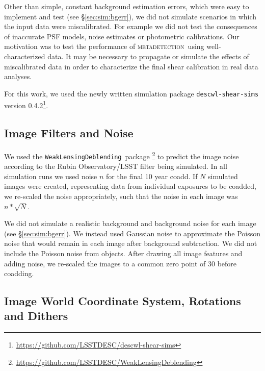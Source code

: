 \documentclass[twocolumn,twocolappendix,astrosym]{openjournal}
\newcommand{\descwl}{\texttt{WeakLensingDeblending}}
\newcommand{\mdet}{\textsc{metadetection}}
\begin{document}
Other than simple, constant background estimation errors, which were easy to
implement and test (see \S \ref{sec:sim:bgerr}), we did not simulate scenarios
in which the input data were miscalibrated.  For example we did not test the
consequences of inaccurate PSF models, noise estimates or photometric
calibrations.  Our motivation was to test the performance of \mdet\ using
well-characterized data. It may be necessary to propagate or simulate the
effects of miscalibrated data in order to characterize the final shear
calibration in real data analyses.

For this work, we used the newly written simulation package
\texttt{descwl-shear-sims} version
0.4.2\footnote{\url{https://github.com/LSSTDESC/descwl-shear-sims}}.

\subsection{Image Filters and Noise} \label{sec:sim:noise}

We used the \descwl\ package
\citep{DESCWLSanchez2021}\footnote{\url{https://github.com/LSSTDESC/WeakLensingDeblending}}
to predict the image noise according to the Rubin Observatory/LSST filter being
simulated.  In all simulation runs we used noise $n$ for the final 10 year
coadd.  If $N$ simulated images were created, representing data from individual
exposures to be coadded, we re-scaled the noise appropriately, such that the
noise in each image was $n * \sqrt{N}$.

We did not simulate a realistic background and background noise for each image
(see \S \ref{sec:sim:bgerr}).  We instead used Gaussian noise to approximate
the Poisson noise that would remain in each image after background subtraction.
We did not include the Poisson noise from objects.  After drawing all image
features and adding noise, we re-scaled the images to a common zero point of
30 before coadding.

\subsection{Image World Coordinate System, Rotations and Dithers} \label{sec:sim:rotdith}
\end{document}
